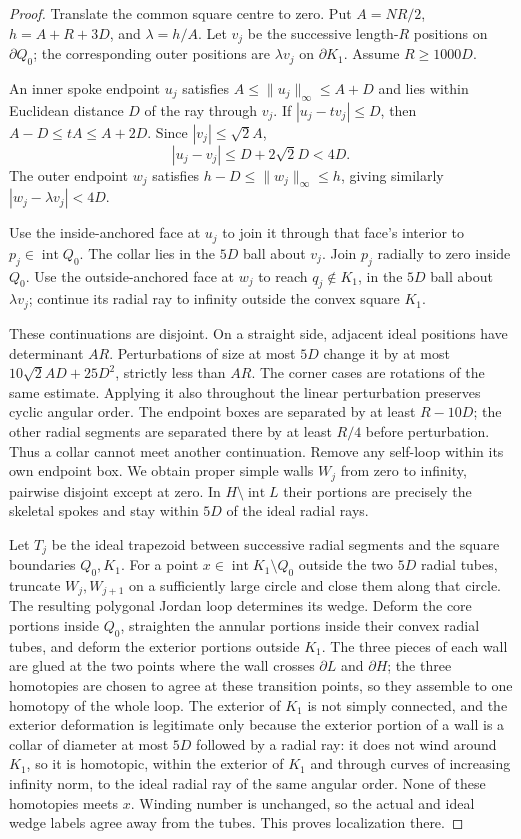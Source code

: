 \begin{proof}
Translate the common square centre to zero.  Put $A=NR/2$,
$h=A+R+3D$, and $\lambda=h/A$.  Let $v_j$ be the successive length-$R$
positions on $\partial Q_0$; the corresponding outer positions are
$\lambda v_j$ on $\partial K_1$.  Assume $R\ge1000D$.

An inner spoke endpoint $u_j$ satisfies
$A\le\|u_j\|_\infty\le A+D$ and lies within Euclidean distance $D$
of the ray through $v_j$.  If $|u_j-tv_j|\le D$, then
$A-D\le tA\le A+2D$.  Since $|v_j|\le\sqrt2A$,
\[
 |u_j-v_j|\le D+2\sqrt2D<4D.
\]
The outer endpoint $w_j$ satisfies
$h-D\le\|w_j\|_\infty\le h$, giving similarly
$|w_j-\lambda v_j|<4D$.

Use the inside-anchored face at $u_j$ to join it through that face's
interior to $p_j\in\operatorname{int}Q_0$.  The collar lies in the
$5D$ ball about $v_j$.  Join $p_j$ radially to zero inside $Q_0$.
Use the outside-anchored face at $w_j$ to reach
$q_j\notin K_1$, in the $5D$ ball about $\lambda v_j$; continue its
radial ray to infinity outside the convex square $K_1$.

These continuations are disjoint.  On a straight side, adjacent ideal
positions have determinant $AR$.  Perturbations of size at most $5D$
change it by at most $10\sqrt2AD+25D^2$, strictly less than $AR$.
The corner cases are rotations of the same estimate.  Applying it also
throughout the linear perturbation preserves cyclic angular order.
The endpoint boxes are separated by at least $R-10D$; the other radial
segments are separated there by at least $R/4$ before perturbation.
Thus a collar cannot meet another continuation.  Remove any self-loop
within its own endpoint box.  We obtain proper simple walls $W_j$ from
zero to infinity, pairwise disjoint except at zero.  In
$H\setminus\operatorname{int}L$ their portions are precisely the
skeletal spokes and stay within $5D$ of the ideal radial rays.

Let $T_j$ be the ideal trapezoid between successive radial segments and
the square boundaries $Q_0,K_1$.  For a point
$x\in\operatorname{int}K_1\setminus Q_0$ outside the two $5D$ radial
tubes, truncate $W_j,W_{j+1}$ on a sufficiently large circle and close
them along that circle.  The resulting polygonal Jordan loop determines
its wedge.  Deform the core portions inside $Q_0$, straighten the
annular portions inside their convex radial tubes, and deform the
exterior portions outside $K_1$.  The three pieces of each wall are glued
at the two points where the wall crosses $\partial L$ and $\partial H$;
the three homotopies are chosen to agree at these transition points, so
they assemble to one homotopy of the whole loop.  The exterior of $K_1$
is not simply connected, and the exterior deformation is legitimate only
because the exterior portion of a wall is a collar of diameter at most
$5D$ followed by a radial ray: it does not wind around $K_1$, so it is
homotopic, within the exterior of $K_1$ and through curves of increasing
infinity norm, to the ideal radial ray of the same angular order.  None
of these homotopies meets $x$.  Winding number is unchanged, so the actual and ideal wedge
labels agree away from the tubes.  This proves localization there.


\end{proof}
